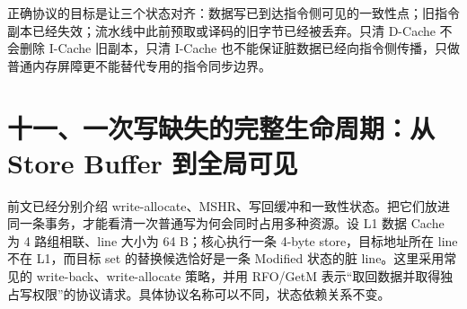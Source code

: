 正确协议的目标是让三个状态对齐：数据写已到达指令侧可见的一致性点；旧指令副本已经失效；流水线中此前预取或译码的旧字节已经被丢弃。只清 D-Cache 不会删除 I-Cache 旧副本，只清 I-Cache 也不能保证脏数据已经向指令侧传播，只做普通内存屏障更不能替代专用的指令同步边界。




























\section{十一、一次写缺失的完整生命周期：从 Store Buffer 到全局可见}

前文已经分别介绍 write-allocate、MSHR、写回缓冲和一致性状态。把它们放进同一条事务，才能看清一次普通写为何会同时占用多种资源。设 L1 数据 Cache 为 4 路组相联、line 大小为 64 B；核心执行一条 4-byte store，目标地址所在 line 不在 L1，而目标 set 的替换候选恰好是一条 Modified 状态的脏 line。这里采用常见的 write-back、write-allocate 策略，并用 RFO/GetM 表示“取回数据并取得独占写权限”的协议请求。具体协议名称可以不同，状态依赖关系不变。

